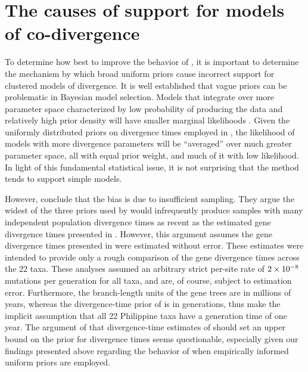 \section{The causes of support for models of co-divergence}
To determine how best to improve the behavior of \msb, it is important to
determine the mechanism by which broad uniform priors cause incorrect support
for clustered models of divergence.
It is well established that vague priors can be problematic in Bayesian model
selection.
Models that integrate over more parameter space characterized by low
probability of producing the data and relatively high prior density will have
smaller marginal likelihoods \citep{Jeffreys1939,Lindley1957}.
Given the uniformly distributed priors on divergence times employed in \msb,
the likelihood of models with more divergence parameters will be ``averaged''
over much greater parameter space, all with equal prior weight, and much of it
with low likelihood.
In light of this fundamental statistical issue, it is not surprising that the
method tends to support simple models.

However, \citet{Hickerson2013} conclude that the bias is due to insufficient
sampling.
They argue the widest of the three priors used by \citet{Oaks2012} would
infrequently produce samples with many independent population divergence times
as recent as the estimated gene divergence times presented in \citet{Oaks2012}.
However, this argument assumes the gene divergence times presented in
\citet{Oaks2012} were estimated without error.
These estimates were intended to provide only a rough comparison of the
gene divergence times across the 22 taxa.
These analyses assumed an arbitrary strict per-site rate of $2\times 10^{-8}$ mutations
per generation for all taxa, and are, of course, subject to estimation error.
Furthermore, the branch-length units of the gene trees are in millions of
years, whereas the divergence-time prior of \msb is in generations, thus
\citet{Hickerson2013} make the implicit assumption that all 22 Philippine taxa
have a generation time of one year.
The argument of \citet{Hickerson2013} that divergence-time estimates of
\citet{Oaks2012} should set an upper bound on the prior for divergence times
seems questionable, especially given our findings presented above regarding the
behavior of \msb when empirically informed uniform priors are employed.

